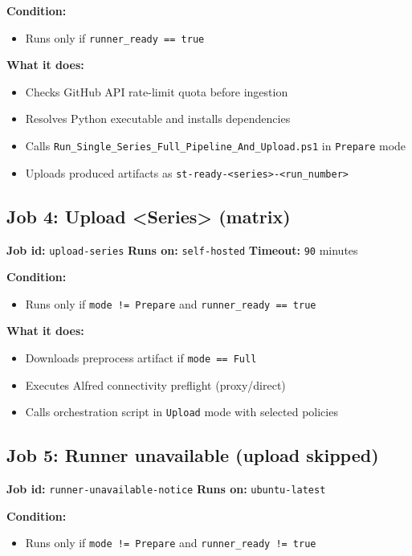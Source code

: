 \documentclass[11pt,a4paper]{article}
\begin{document}
\textbf{Condition:}
\begin{itemize}
  \item Runs only if \texttt{runner\_ready == true}
\end{itemize}

\textbf{What it does:}
\begin{itemize}
  \item Checks GitHub API rate-limit quota before ingestion
  \item Resolves Python executable and installs dependencies
  \item Calls \texttt{Run\_Single\_Series\_Full\_Pipeline\_And\_Upload.ps1} in \texttt{Prepare} mode
  \item Uploads produced artifacts as \texttt{st-ready-<series>-<run\_number>}
\end{itemize}

\subsection{Job 4: Upload <Series> (matrix)}
\textbf{Job id:} \texttt{upload-series}\newline
\textbf{Runs on:} \texttt{self-hosted}\newline
\textbf{Timeout:} \texttt{90} minutes

\textbf{Condition:}
\begin{itemize}
  \item Runs only if \texttt{mode != Prepare} and \texttt{runner\_ready == true}
\end{itemize}

\textbf{What it does:}
\begin{itemize}
  \item Downloads preprocess artifact if \texttt{mode == Full}
  \item Executes Alfred connectivity preflight (proxy/direct)
  \item Calls orchestration script in \texttt{Upload} mode with selected policies
\end{itemize}

\subsection{Job 5: Runner unavailable (upload skipped)}
\textbf{Job id:} \texttt{runner-unavailable-notice}\newline
\textbf{Runs on:} \texttt{ubuntu-latest}

\textbf{Condition:}
\begin{itemize}
  \item Runs only if \texttt{mode != Prepare} and \texttt{runner\_ready != true}
\end{itemize}
\end{document}
